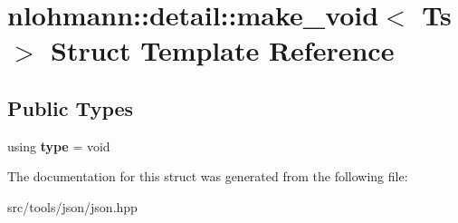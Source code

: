\hypertarget{structnlohmann_1_1detail_1_1make__void}{}\section{nlohmann\+:\+:detail\+:\+:make\+\_\+void$<$ Ts $>$ Struct Template Reference}
\label{structnlohmann_1_1detail_1_1make__void}
\subsection*{Public Types}
\begin{DoxyCompactItemize}
\item 
\mbox{\label{structnlohmann_1_1detail_1_1make__void_a8961e24ae3b2cb65ec47d1ce805d94e4}} 
using {\bfseries type} = void
\end{DoxyCompactItemize}


The documentation for this struct was generated from the following file\+:\begin{DoxyCompactItemize}
\item 
src/tools/json/json.\+hpp\end{DoxyCompactItemize}
